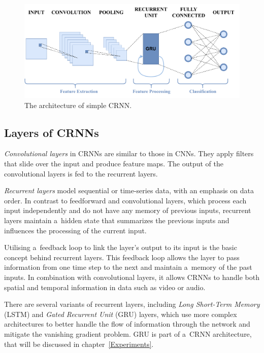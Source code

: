     \begin{figure}[ht!]
        \centering
        \includegraphics[width = \textwidth]{obrazky-figures/CRNN_layers.pdf}
        \caption{The architecture of simple CRNN.}
        \label{fig:CRNN_layers}
    \end{figure}

\subsection{Layers of CRNNs}

\textit{Convolutional layers} in CRNNs are similar to those in CNNs. They apply filters that slide over the input and produce feature maps. The output of the convolutional layers is fed to the recurrent layers.

\textit{Recurrent layers} model sequential or time-series data, with an emphasis on data order. In contrast to feedforward and convolutional layers, which process each input independently and do not have any memory of previous inputs, recurrent layers maintain a~hidden state that summarizes the previous inputs and influences the processing of the current input.

Utilising a~feedback loop to link the layer's output to its input is the basic concept behind recurrent layers. This feedback loop allows the layer to pass information from one time step to the next and maintain a~memory of the past inputs. In combination with convolutional layers, it allows CRNNs to handle both spatial and temporal information in data such as video or audio.

There are several variants of recurrent layers, including \textit{Long Short-Term Memory} (LSTM) and \textit{Gated Recurrent Unit} (GRU) layers, which use more complex architectures to better handle the flow of information through the network and mitigate the vanishing gradient problem. GRU is part of a~CRNN architecture, that will be discussed in chapter~\ref{Experiments}.

